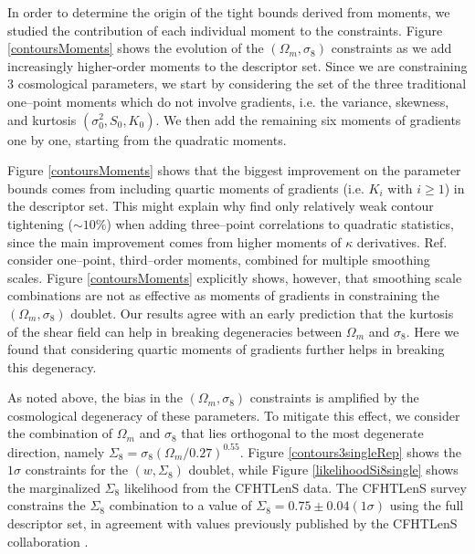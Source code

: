 \documentclass[reprint,aps,prd,superscriptaddress,showkeys,showpacs]{revtex4-1}
\begin{document}
In order to determine the origin of the tight bounds derived from
moments, we studied the contribution of each individual moment to the
constraints. Figure \ref{contoursMoments} shows the evolution of the
$(\Omega_m,\sigma_8)$ constraints as we add increasingly higher-order
moments to the descriptor set. Since we are constraining 3
cosmological parameters, we start by considering the set of the three
traditional one--point moments which do not involve gradients,
i.e. the variance, skewness, and kurtosis $(\sigma_0^2,S_0,K_0)$. We
then add the remaining six moments of gradients one by one, starting
from the quadratic moments. 

Figure \ref{contoursMoments} shows that the biggest improvement on the
parameter bounds comes from including quartic moments of gradients
(i.e. $K_i$ with $i\ge1$) in the descriptor set. This might explain
why \citep{CFHTFu} find only relatively weak contour tightening
($\sim10\%$) when adding three--point correlations to quadratic
statistics, since the main improvement comes from higher moments of
$\kappa$ derivatives. Ref.~\citep{CFHTFu} consider one--point,
third--order moments, combined for multiple smoothing scales. Figure
\ref{contoursMoments} explicitly shows, however, that smoothing scale
combinations are not as effective as moments of gradients in
constraining the $(\Omega_m,\sigma_8)$ doublet. Our results agree with
an early prediction \citep{moments4} that the kurtosis of the shear
field can help in breaking degeneracies between $\Omega_m$ and
$\sigma_8$.  Here we found that considering quartic moments of
gradients further helps in breaking this degeneracy.

As noted above, the bias in the $(\Omega_m,\sigma_8)$ constraints is
amplified by the cosmological degeneracy of these parameters. To
mitigate this effect, we consider the combination of $\Omega_m$ and
$\sigma_8$ that lies orthogonal to the most degenerate direction,
namely $\Sigma_8=\sigma_8(\Omega_m/0.27)^{0.55}$. Figure
\ref{contours3singleRep} shows the $1\sigma$ constraints for the
$(w,\Sigma_8)$ doublet, while Figure \ref{likelihoodSi8single} shows
the marginalized $\Sigma_8$ likelihood from the CFHTLenS data. The
CFHTLenS survey constrains the $\Sigma_8$ combination to a value of
$\Sigma_8=0.75\pm0.04(1\sigma)$ using the full descriptor set, in
agreement with values previously published by the CFHTLenS
collaboration \citep{CFHTKilbinger}. 
\end{document}

